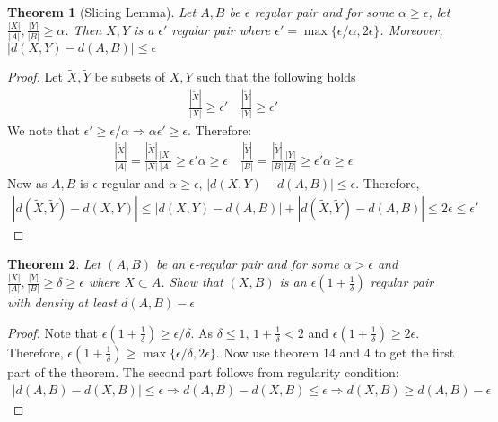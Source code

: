 \documentclass{article}
\newtheorem{theorem}{Theorem}[]
\begin{document}
\begin{theorem}[Slicing Lemma]
	Let $A,B$ be $\epsilon$ regular pair and for some $\alpha\geq \epsilon$, let $\frac{|X|}{|A|},\frac{|Y|}{|B|}\geq  \alpha$. Then $X,Y$ is a $\epsilon'$ regular pair where $\epsilon'=\max\{\epsilon/\alpha,2\epsilon\}$. Moreover, $|d(X,Y)-d(A,B)|\leq \epsilon$
\end{theorem}
\begin{proof}
	Let $\tilde{X},\tilde{Y}$ be subsets of $X,Y$ such that the following holds
	\begin{align}\frac{|\tilde{X}|}{|X|}\geq  \epsilon'\quad \frac{|\tilde{Y}|}{|Y|}\geq  \epsilon'\end{align}
	We note that $\epsilon'\geq \epsilon/\alpha\Rightarrow \alpha\epsilon'\geq \epsilon$. Therefore:
	\begin{align}\frac{|\tilde{X}|}{|A|}=\frac{|\tilde{X}|}{|X|}\frac{|X|}{|A|}\geq  \epsilon'\alpha\geq \epsilon\quad \frac{|\tilde{Y}|}{|B|}=\frac{|\tilde{Y}|}{|B|}\frac{|Y|}{|B|}\geq  \epsilon'\alpha\geq \epsilon\end{align}
	Now as $A,B$ is $\epsilon$ regular and $\alpha\geq \epsilon$, $|d(X,Y)-d(A,B)|\leq \epsilon$. Therefore,
	\begin{align}
		|d(\tilde X,\tilde Y)-d(X,Y)|\leq |d(X,Y)-d(A,B)|+|d(\tilde X,\tilde Y)-d(A,B)|\leq  2\epsilon\leq  \epsilon'
	\end{align}
\end{proof}





\begin{theorem}
	Let $(A,B)$ be an $\epsilon$-regular pair and for some $\alpha>\epsilon$ and $\frac{|X|}{|A|},\frac{|Y|}{|B|}\geq \delta\geq \epsilon$ where $X\subset A$. Show that $(X,B)$ is an $\epsilon(1+\frac{1}{\delta})$ regular pair with density at least $d(A,B)-\epsilon$
\end{theorem}
\begin{proof}
	Note that $\epsilon(1+\frac{1}{\delta})\geq \epsilon/\delta$. As $\delta\leq 1$, $1+\frac{1}{\delta}<2$ and $\epsilon(1+\frac{1}{\delta})\geq 2\epsilon$. Therefore,  $\epsilon(1+\frac{1}{\delta})\geq\max \{\epsilon/\delta,2\epsilon\}$. Now use theorem 14 and 4 to get the first part of the theorem. The second part follows from regularity condition:
	\begin{align}
		|d(A,B)-d(X,B)|\leq\epsilon\Rightarrow d(A,B)-d(X,B)\leq\epsilon\Rightarrow d(X,B)\geq d(A,B)-\epsilon
	\end{align}
\end{proof}
\end{document}
